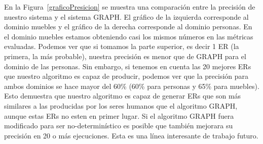 \begin{table}[H]
En la Figura~\ref{graficoPresicion} se muestra una comparaci\'on entre la precisi\'on de nuestro sistema y el sistema GRAPH. El gr\'afico de la izquierda corresponde al dominio muebles y el gr\'afico de la derecha corresponde al dominio personas. En el dominio muebles estamos obteniendo casi los mismos n\'umeros en las m\'etricas evaluadas.
Podemos ver que si tomamos la parte superior, es decir 1 ER (la primera, la m\'as probable), nuestra precisi\'on es menor que de GRAPH para el dominio de las personas. Sin embargo, si tenemos en cuenta las 20 mejores ERs que nuestro algoritmo es capaz de producir, podemos ver que la precisi\'on para ambos dominios se hace mayor del 60\% (60\% para personas y 65\% para muebles). Esto demuestra que nuestro algoritmo es capaz de generar ERs que son m\'as similares a las producidas por los seres humanos que el algoritmo GRAPH, aunque estas ERs no esten en primer lugar. Si el algoritmo GRAPH fuera modificado para ser no-determin\'istico es posible que tambi\'en mejorara su precisi\'on en 20 o m\'as ejecuciones. Esta es una l\'inea interesante de trabajo futuro. 


\end{table}
